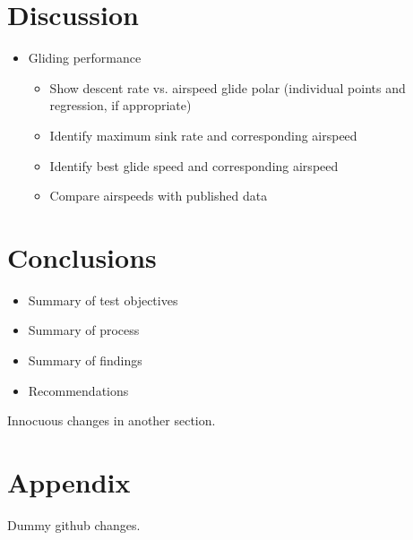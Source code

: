 \documentclass[conf]{new-aiaa}
\begin{document}
\section{Discussion}

\begin{itemize}
	\item Gliding performance
	\begin{itemize}
		\item Show descent rate vs. airspeed glide polar (individual points and regression, if appropriate)
		\item Identify maximum sink rate and corresponding airspeed
		\item Identify best glide speed and corresponding airspeed
		\item Compare airspeeds with published data
	\end{itemize}
\end{itemize}

\section{Conclusions}

\begin{itemize}
	\item Summary of test objectives
	\item Summary of process
	\item Summary of findings
	\item Recommendations
\end{itemize}

Innocuous changes in another section.

\section{Appendix}

Dummy github changes.
\end{document}
